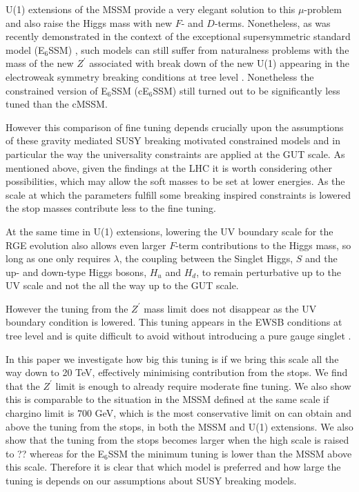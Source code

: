 \documentclass[preprint,amsmath,amssymb,aps,superscriptaddress,prd,showpacs,floatfix]{revtex4-1}
\begin{document}
U(1) extensions of the MSSM provide a very elegant solution to this
$\mu$-problem \cite{Fayet:1977yc, Kim:1983dt, Suematsu:1994qm, Cvetic:1995rj,  Cvetic:1996mf, Jain:1995cb, Nir:1995bu, Cvetic:1997ky} and also
raise the Higgs mass with new $F$- and $D$-terms. Nonetheless, as was
recently demonstrated in the context of the exceptional supersymmetric
standard model (E$_6$SSM)
\cite{King:2005jy,King:2005my,Athron:2010zz}, such models can still suffer from
naturalness problems with the mass of the new $Z^\prime$ associated
with break down of the new U(1) appearing in the electroweak symmetry
breaking conditions at tree level \cite{Athron:2013ipa}.  Nonetheless
the constrained version of E$_6$SSM (cE$_6$SSM) \cite{Athron:2009ue,
  Athron:2009bs} still turned out to be significantly less tuned than
the cMSSM.

However this comparison of fine tuning depends crucially upon the
assumptions of these gravity mediated SUSY breaking motivated
constrained models and in particular the way the universality
constraints are applied at the GUT scale.  As mentioned above, given
the findings at the LHC it is worth considering other possibilities,
which may allow the soft masses to be set at lower energies. As the
scale at which the parameters fulfill some breaking inspired
constraints is lowered the stop masses contribute less to the fine
tuning.

At the same time in U(1) extensions, lowering the UV boundary scale
for the RGE evolution also allows even larger $F$-term contributions
to the Higgs mass, so long as one only requires $\lambda$, the
coupling between the Singlet Higgs, $S$ and the up- and down-type
Higgs bosons, $H_u$ and $H_d$, to remain perturbative up to the UV scale
and not the all the way up to the GUT scale. 

However the tuning from the $Z^\prime$ mass limit does not disappear
as the UV boundary condition is lowered. This tuning appears in the
EWSB conditions at tree level and is quite difficult to avoid without
introducing a pure gauge singlet \cite{Athron:2014pua}.



In this paper we investigate how big this tuning is if we bring this
scale all the way down to 20 TeV, effectively minimising contribution
from the stops. We find that the $Z^\prime$ limit is enough to already
require moderate fine tuning.  We also show this is comparable to the
situation in the MSSM defined at the same scale if chargino limit is
$700$ GeV, which is the most conservative limit on can obtain and
above the tuning from the stops, in both the MSSM and U(1) extensions.
We also show that the tuning from the stops becomes larger when the
high scale is raised to ?? whereas for the E$_6$SSM the minimum tuning
is lower than the MSSM above this scale.  Therefore it is clear that
which model is preferred and how large the tuning is depends on our
assumptions about SUSY breaking models.
\end{document}
